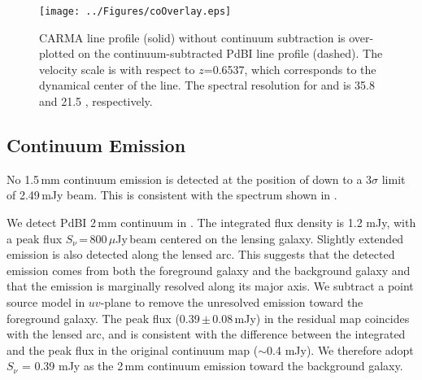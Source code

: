 \documentclass[]{emulateapj}
\begin{document}
\begin{figure}[!htbp]
\texttt{[image: ../Figures/coOverlay.eps]}
\caption{CARMA \cco line profile (solid) without continuum subtraction is
over-plotted on the continuum-subtracted PdBI \bco line profile (dashed).
The velocity scale is with respect to $z$=0.6537, which corresponds to the
dynamical center of the \bco line. The spectral resolution for \cco and \bco
is 35.8 \kms and 21.5 \kms, respectively.
 \label{fig:co32spec}}
\end{figure}



\subsection{Continuum Emission} %
No 1.5\,mm continuum emission is detected at the position of \cco
down to a 3$\sigma$ limit of 2.49\,mJy beam\pmOne.
This is consistent with the spectrum shown in .

We detect PdBI 2\,mm continuum in . The integrated flux density is
1.2 mJy, with a peak flux
$S_\nu$\,=\,800\,$\mu$Jy\,beam\pmOne
centered on the lensing galaxy. Slightly extended emission is also detected
along the lensed arc. This suggests that the detected emission comes from
both the foreground galaxy and the background galaxy and that the
emission is marginally resolved along its major axis.
We subtract a point source model in $uv$-plane to remove the unresolved
emission toward the foreground galaxy. The peak flux (0.39\,$\pm$\,0.08\,mJy)
in the residual map coincides with the lensed arc, and is consistent with
the difference between the integrated and the peak flux in the
original continuum map ($\sim$0.4 mJy). We therefore adopt
$S_\nu$ = 0.39 mJy as the 2\,mm continuum emission toward
the background galaxy.
\end{document}
